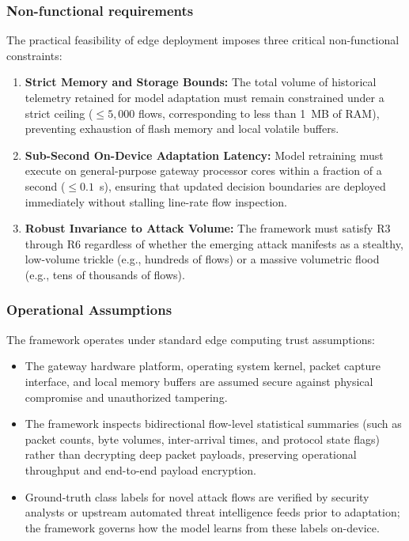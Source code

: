 \subsubsection{Non-functional requirements}
The practical feasibility of edge deployment imposes three critical non-functional constraints:
\begin{enumerate}
    \item[\textbf{R5.}] \textbf{Strict Memory and Storage Bounds:} The total volume of historical telemetry retained for model adaptation must remain constrained under a strict ceiling ($\le 5{,}000$ flows, corresponding to less than 1~MB of RAM), preventing exhaustion of flash memory and local volatile buffers.
    \item[\textbf{R6.}] \textbf{Sub-Second On-Device Adaptation Latency:} Model retraining must execute on general-purpose gateway processor cores within a fraction of a second ($\le 0.1$~s), ensuring that updated decision boundaries are deployed immediately without stalling line-rate flow inspection.
    \item[\textbf{R7.}] \textbf{Robust Invariance to Attack Volume:} The framework must satisfy R3 through R6 regardless of whether the emerging attack manifests as a stealthy, low-volume trickle (e.g., hundreds of flows) or a massive volumetric flood (e.g., tens of thousands of flows).
\end{enumerate}

\subsubsection{Operational Assumptions}
The framework operates under standard edge computing trust assumptions:
\begin{itemize}
    \item The gateway hardware platform, operating system kernel, packet capture interface, and local memory buffers are assumed secure against physical compromise and unauthorized tampering.
    \item The framework inspects bidirectional flow-level statistical summaries (such as packet counts, byte volumes, inter-arrival times, and protocol state flags) rather than decrypting deep packet payloads, preserving operational throughput and end-to-end payload encryption.
    \item Ground-truth class labels for novel attack flows are verified by security analysts or upstream automated threat intelligence feeds prior to adaptation; the framework governs how the model learns from these labels on-device.
\end{itemize}

